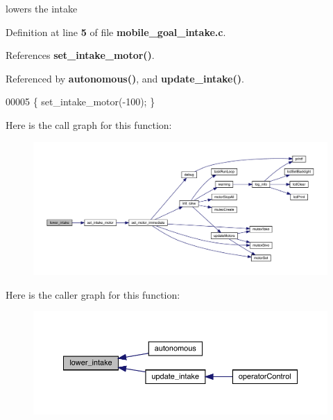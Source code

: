 lowers the intake 



Definition at line \textbf{ 5} of file \textbf{ mobile\+\_\+goal\+\_\+intake.\+c}.



References \textbf{ set\+\_\+intake\+\_\+motor()}.



Referenced by \textbf{ autonomous()}, and \textbf{ update\+\_\+intake()}.


\begin{DoxyCode}
00005 \{ set_intake_motor(-100); \}
\end{DoxyCode}
Here is the call graph for this function\+:
\nopagebreak
\begin{figure}[H]
\begin{center}
\leavevmode
\includegraphics[width=350pt]{mobile__goal__intake_8h_aef03134014e51a6a90dd3824f09f4d6c_cgraph}
\end{center}
\end{figure}
Here is the caller graph for this function\+:
\nopagebreak
\begin{figure}[H]
\begin{center}
\leavevmode
\includegraphics[width=350pt]{mobile__goal__intake_8h_aef03134014e51a6a90dd3824f09f4d6c_icgraph}
\end{center}
\end{figure}
\mbox{\label{mobile__goal__intake_8h_aa46a9341d1eb7b39a2ef4cc5079ee3ca}} 
